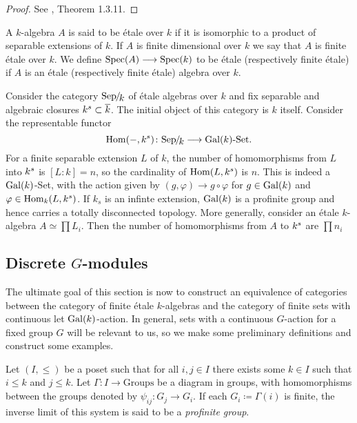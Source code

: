 \begin{proof}
	See \cite{Szamuely}, Theorem 1.3.11.
\end{proof}

\begin{definition}
	A $k$-algebra $A$ is said to be \'etale over $k$ if it is isomorphic to a product of separable extensions of $k$. If $A$ is finite dimensional over $k$ we say that $A$ is finite \'etale over $k$. We define $\operatorname{Spec}(A) \longrightarrow \operatorname{Spec}(k)$ to be \'etale (respectively finite \'etale) if $A$ is an \'etale (respectively finite \'etale) algebra over $k$.
\end{definition}

\begin{construction}\label{construction:separable_category}
	Consider the category $\Sepk$ of \'etale algebras over $k$ and fix separable and algebraic closures $k^s \subset \overline{k}$. The initial object of this category is $k$ itself. Consider the representable functor
	\[
		\Hom(-, k^\sep) \colon \Sepk \to \Gal(k)\text{-Set}.
	\]
	For a finite separable extension $L$ of $k$, the number of homomorphisms from $L$ into $k^s$ is $[L:k] = n$, so the cardinality of $\operatorname{Hom}(L, k^s)$ is $n$. This is indeed a $\operatorname{Gal}(k)$-Set, with the action given by $(g, \varphi) \to g \circ \varphi$ for $g \in \operatorname{Gal}(k)$ and $\varphi \in \operatorname{Hom}_k(L, k^s)$. If $k_s$ is an infinte extension, $\operatorname{Gal}(k)$ is a profinite group and hence carries a totally disconnected topology. More generally, consider an \'etale $k$-algebra $A \simeq \prod L_i$. Then the number of homomorphisms from $A$ to $k^s$ are $\prod n_i$
\end{construction}

\subsection{Discrete \texorpdfstring{$G$}{G}-modules}
The ultimate goal of this section is now to construct an equivalence of categories between the category of finite \'etale $k$-algebras and the category of finite sets with continuous let $\operatorname{Gal}(k)$-action. In general, sets with a continuous $G$-action for a fixed group $G$ will be relevant to us, so we make some preliminary definitions and construct some examples.

\begin{definition}
	Let $(I, \le)$ be a poset such that for all $i, j \in I$ there exists some $k \in I$ such that $i \le k$ and $j \le k$. Let $\Gamma \colon I \to \text{Groups}$ be a diagram in groups, with homomorphisms between the groups denoted by $\psi_{ij} \colon G_j \to G_i$. If each $G_i \coloneqq \Gamma(i)$ is finite, the inverse limit of this system is said to be a \textit{profinite group}.
\end{definition}


